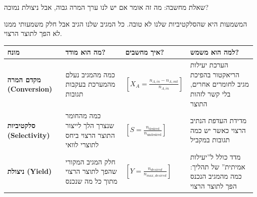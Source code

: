 \documentclass[
  hebrew,
  letterpaper,
  DIV=11,
  numbers=noendperiod]{scrreprt}
\begin{document}
שאלת מחשבה: מה זה אומר אם יש לנו ערך המרה גבוה, אבל ניצולת נמוכה?

\begin{tcolorbox}[enhanced jigsaw, colback=white, arc=.35mm, coltitle=black, breakable, toptitle=1mm, leftrule=.75mm, colbacktitle=quarto-callout-note-color!10!white, opacitybacktitle=0.6, bottomtitle=1mm, titlerule=0mm, opacityback=0, colframe=quarto-callout-note-color-frame, title=\textcolor{quarto-callout-note-color}{\faInfo}\hspace{0.5em}{פתרון}, rightrule=.15mm, bottomrule=.15mm, toprule=.15mm, left=2mm]

המשמעות היא שהסלקטיביות שלנו לא טובה. כל המגיב שלנו הגיב אבל חלק משמעותי
ממנו לא הפך לתוצר הרצוי.

\end{tcolorbox}

\begin{longtable}[]{@{}
  >{\raggedright\arraybackslash}p{}
  >{\raggedright\arraybackslash}p{}
  >{\raggedright\arraybackslash}p{}
  >{\raggedright\arraybackslash}p{}@{}}
\toprule\noalign{}
\begin{minipage}[b]{\linewidth}\raggedright
\textbf{מונח}
\end{minipage} & \begin{minipage}[b]{\linewidth}\raggedright
\textbf{מה הוא מודד?}
\end{minipage} & \begin{minipage}[b]{\linewidth}\raggedright
\textbf{איך מחשבים?}
\end{minipage} & \begin{minipage}[b]{\linewidth}\raggedright
\textbf{למה הוא משמש?}
\end{minipage} \\
\midrule\noalign{}
\endhead
\bottomrule\noalign{}
\endlastfoot
\textbf{מקדם המרה (Conversion)} & כמה מהמגיב נעלם מהמערכת בעקבות תגובות
&
\(\left\lbrack X_{A} = \frac{n_{A,in} - n_{A,out}}{n_{A,in}} \right\rbrack\)
& הערכת יעילות הריאקטור בהפיכת מגיב לחומרים אחרים, בלי קשר לזהות
התוצר \\
\textbf{סלקטיביות (Selectivity)} & כמה מהחומר שנצרך הלך לייצור התוצר
הרצוי ביחס לתוצרי לוואי &
\(\left\lbrack S = \frac{n_{\text{desired}}}{n_{\text{undesired}}} \right\rbrack\)
& מדידת העדפת הנתיב הרצוי כאשר יש כמה תגובות במקביל \\
\textbf{ניצולת (Yield)} & חלק המגיב המקורי שהפך לתוצר הרצוי מתוך כל מה
שנכנס &
\(\left\lbrack Y = \frac{n_{desired}}{n_{max,desired}} \right\rbrack\) &
מדד כולל ל''יעילות אמיתית'' של תהליך: כמה מהמגיב הנכנס הפך לתוצר
הרצוי \\
\end{longtable}
\end{document}
